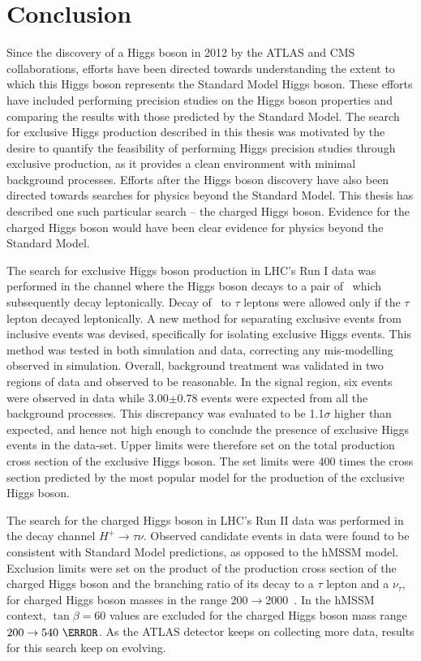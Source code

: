 \chapter{Conclusion}
\par Since the discovery of a Higgs boson in 2012 by the ATLAS and CMS collaborations, 
efforts have been directed towards understanding the extent to which this Higgs boson 
represents the Standard Model Higgs boson. These efforts have included performing precision 
studies on the Higgs boson properties and comparing the results with those predicted 
by the Standard Model. The search for exclusive Higgs production described in this  
thesis was motivated by the desire to quantify the feasibility of performing Higgs precision 
studies through exclusive production, as it provides a clean environment with minimal 
background processes. Efforts after the Higgs boson discovery have also been directed towards 
searches for physics beyond the Standard Model. This thesis has described one such particular 
search -- the charged Higgs boson. Evidence for the charged Higgs boson would have 
been clear evidence for physics beyond the Standard Model.    

\par The search for exclusive Higgs boson production in LHC's Run I data was performed 
in the channel where the Higgs boson decays to a pair of \Wpm\ which subsequently decay 
leptonically. Decay of \Wpm\ to $\tau$ leptons were allowed only if the $\tau$ lepton 
decayed leptonically. A new method for separating exclusive events from inclusive events was devised, specifically for 
isolating exclusive Higgs events. This method was tested in both simulation and data, correcting any mis-modelling 
observed in simulation. Overall, background treatment was validated in two regions of data and observed to 
be reasonable. In the signal region, six events were observed in data while 3.00$\pm$0.78 events were expected from all 
the background processes. This discrepancy was evaluated to be 1.1$\sigma$ higher than expected, and hence 
not high enough to conclude the presence of exclusive Higgs events in the data-set. Upper limits were therefore 
set on the total production cross section of the exclusive Higgs boson. The set limits were 400 times 
the cross section predicted by the most popular model for the production of the exclusive Higgs boson.  

\par The search for the charged Higgs boson in LHC's Run II data was performed in the decay 
channel $H^+\to\tau\nu$. Observed candidate events in data were found to be 
consistent with Standard Model predictions, as opposed to the hMSSM model. 
Exclusion limits were set on the product of the production 
cross section of the charged Higgs boson and the branching ratio of its decay to a 
$\tau$ lepton and a $\nu_\tau$, for charged Higgs boson masses in the range 200$\to$2000~\GeV. 
In the hMSSM context, $\tan\beta=60$ values are excluded for the charged Higgs boson 
mass range $200\to 540~\GeV$. As the ATLAS detector keeps on collecting more data, 
results for this search keep on evolving. 	  
